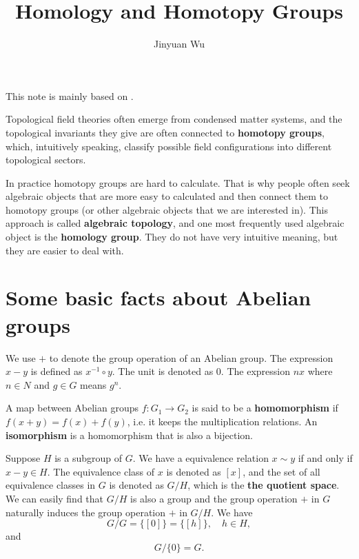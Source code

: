 \documentclass[hyperref, a4paper]{article}
\title{Homology and Homotopy Groups}
\author{Jinyuan Wu}
\newcommand*{\concept}[1]{{\textbf{#1}}}
\def\mathbb#1{#1}%
\begin{document}
\maketitle

This note is mainly based on \cite{nakahara}.

Topological field theories often emerge from condensed matter systems, and the topological invariants they give
are often connected to \concept{homotopy groups}, which, intuitively speaking, classify possible field 
configurations into different topological sectors. 

In practice homotopy groups are hard to calculate. That is why people often seek algebraic objects that 
are more easy to calculated and then connect them to homotopy groups (or other algebraic objects that we
are interested in). This approach is called \concept{algebraic topology}, and one most frequently used 
algebraic object is the \concept{homology group}. They do not have very intuitive meaning, but they are 
easier to deal with.

\section{Some basic facts about Abelian groups}

We use $+$ to denote the group operation of an Abelian group.
The expression $x - y$ is defined as $x^{-1} \circ y$.
The unit is denoted as $0$.
The expression $n x$ where $n \in \mathbb{N}$ and $g \in G$ means $g^n$.

A map between Abelian groups $f: G_1 \to G_2$ is said
to be a \concept{homomorphism} if $f(x + y) = f(x) + f(y)$, i.e. it keeps the multiplication relations. 
An \concept{isomorphism} is a homomorphism that is also a bijection. 

Suppose $H$ is a subgroup of $G$. We have a equivalence relation $x \sim y$ if and only if $x - y \in H$.
The equivalence class of $x$ is denoted as $[x]$, and the set of all equivalence classes in $G$ is denoted 
as $G / H$, which is the \concept{the quotient space}. We can easily find that $G / H$ is also a group 
and the group operation $+$ in $G$ naturally induces the group operation $+$ in $G/H$.
We have 
\begin{equation}
    G / G = \{ [0] \} = \{ [h] \}, \quad h \in H, 
\end{equation}
and 
\begin{equation}
    G / \{0\} = G.
\end{equation}
\end{document}
